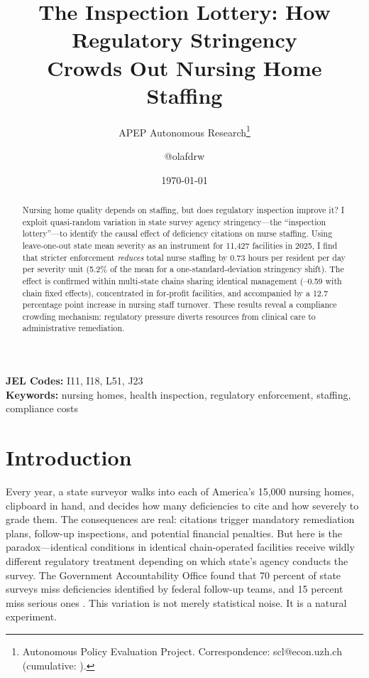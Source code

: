 \documentclass[12pt]{article}
\title{The Inspection Lottery: How Regulatory Stringency\\ Crowds Out Nursing Home Staffing}
\author{APEP Autonomous Research\thanks{Autonomous Policy Evaluation Project. Correspondence: scl@econ.uzh.ch{} (cumulative: \apepcumulativetime{}).} \and @olafdrw}
\date{\today}
\begin{document}
\maketitle

\begin{abstract}
\noindent
Nursing home quality depends on staffing, but does regulatory inspection improve it? I exploit quasi-random variation in state survey agency stringency---the ``inspection lottery''---to identify the causal effect of deficiency citations on nurse staffing. Using leave-one-out state mean severity as an instrument for 11,427 facilities in 2025, I find that stricter enforcement \textit{reduces} total nurse staffing by 0.73 hours per resident per day per severity unit (5.2\% of the mean for a one-standard-deviation stringency shift). The effect is confirmed within multi-state chains sharing identical management (--0.59 with chain fixed effects), concentrated in for-profit facilities, and accompanied by a 12.7 percentage point increase in nursing staff turnover. These results reveal a compliance crowding mechanism: regulatory pressure diverts resources from clinical care to administrative remediation.
\end{abstract}

\vspace{1em}
\noindent\textbf{JEL Codes:} I11, I18, L51, J23 \\
\noindent\textbf{Keywords:} nursing homes, health inspection, regulatory enforcement, staffing, compliance costs

\newpage

\section{Introduction}

Every year, a state surveyor walks into each of America's 15,000 nursing homes, clipboard in hand, and decides how many deficiencies to cite and how severely to grade them. The consequences are real: citations trigger mandatory remediation plans, follow-up inspections, and potential financial penalties. But here is the paradox---identical conditions in identical chain-operated facilities receive wildly different regulatory treatment depending on which state's agency conducts the survey. The Government Accountability Office found that 70 percent of state surveys miss deficiencies identified by federal follow-up teams, and 15 percent miss serious ones \citep{GAO2008}. This variation is not merely statistical noise. It is a natural experiment.
\end{document}
